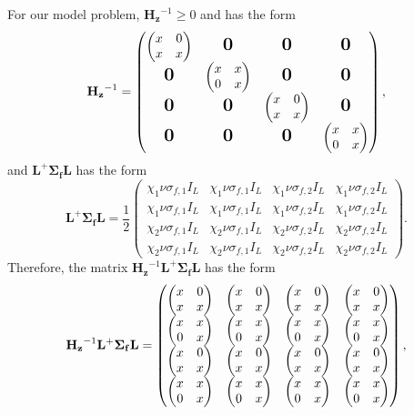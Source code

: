 For our model problem, $\mathbf{H_{z}}^{-1} \geq 0$ and has the form \cite{greenbaum1997iterative}
\begin{equation}
	\mathbf{H_{z}}^{-1} = \begin{pmatrix}
  \begin{pmatrix}
  x & 0 \\
  x & x
  \end{pmatrix} & \bigzero & \bigzero & \bigzero \\
  \bigzero & 
  \begin{pmatrix}
  x & x \\
  0 & x
  \end{pmatrix} & \bigzero & \bigzero \\
  \bigzero & \bigzero & \begin{pmatrix}
  x & 0 \\
  x & x
  \end{pmatrix} & \bigzero \\
  \bigzero & \bigzero & \bigzero & \begin{pmatrix}
  x & x \\
  0 & x
  \end{pmatrix}
\end{pmatrix},
\end{equation}
and $\mathbf{L}^{+}  \mathbf{\Sigma_{f}} \mathbf{L}$ has the form
\begin{equation}
\mathbf{L}^{+}  \mathbf{\Sigma_{f}} \mathbf{L} = \frac{1}{2}
	\begin{pmatrix}
		\chi_{1} \nu \sigma_{f,1} I_{L} & \chi_{1}\nu \sigma_{f,1} I_{L}& \chi_{1}\nu \sigma_{f,2} I_{L} & \chi_{1} \nu \sigma_{f,2} I_{L} \\
		\chi_{1}\nu \sigma_{f,1} I_{L} & \chi_{1}\nu \sigma_{f,1} I_{L}& \chi_{1}\nu \sigma_{f,2} I_{L} & \chi_{1}\nu \sigma_{f,2} I_{L} \\
		\chi_{2}\nu \sigma_{f,1} I_{L} & \chi_{2}\nu \sigma_{f,1} I_{L}& \chi_{2}\nu \sigma_{f,2} I_{L} & \chi_{2}\nu \sigma_{f,2} I_{L} \\
		\chi_{2}\nu \sigma_{f,1} I_{L} & \chi_{2}\nu \sigma_{f,1} I_{L}& \chi_{2}\nu \sigma_{f,2} I_{L} & \chi_{2}\nu \sigma_{f,2} I_{L}
	\end{pmatrix}.
\end{equation}
Therefore, the matrix $\mathbf{H_{z}}^{-1} \mathbf{L}^{+}  \mathbf{\Sigma_{f}} \mathbf{L}$ has the form
\begin{equation}
	\mathbf{H_{z}}^{-1} \mathbf{L}^{+}  \mathbf{\Sigma_{f}} \mathbf{L} = \begin{pmatrix}
		\LTx & \LTx & \LTx & \LTx \\
		\UTx & \UTx & \UTx & \UTx \\
		\LTx & \LTx & \LTx & \LTx \\
		\UTx & \UTx & \UTx & \UTx
	\end{pmatrix},
\end{equation}
